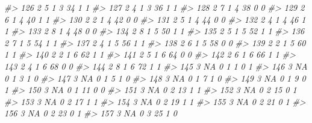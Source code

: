 \documentclass[]{book}
\newenvironment{Shaded}{\begin{snugshade}}{\end{snugshade}}
\newcommand{\CommentTok}[1]{\textcolor[rgb]{0.56,0.35,0.01}{\textit{#1}}}
\begin{document}
\begin{Shaded}
\begin{Highlighting}[]
\CommentTok{#> 126     2         5         1     3    34           1            1}
\CommentTok{#> 127     2         4         1     3    36           1            1}
\CommentTok{#> 128     2         7         1     4    38           0            0}
\CommentTok{#> 129     2         6         1     4    40           1            1}
\CommentTok{#> 130     2         2         1     4    42           0            0}
\CommentTok{#> 131     2         5         1     4    44           0            0}
\CommentTok{#> 132     2         4         1     4    46           1            1}
\CommentTok{#> 133     2         8         1     4    48           0            0}
\CommentTok{#> 134     2         8         1     5    50           1            1}
\CommentTok{#> 135     2         5         1     5    52           1            1}
\CommentTok{#> 136     2         7         1     5    54           1            1}
\CommentTok{#> 137     2         4         1     5    56           1            1}
\CommentTok{#> 138     2         6         1     5    58           0            0}
\CommentTok{#> 139     2         2         1     5    60           1            1}
\CommentTok{#> 140     2         2         1     6    62           1            1}
\CommentTok{#> 141     2         5         1     6    64           0            0}
\CommentTok{#> 142     2         6         1     6    66           1            1}
\CommentTok{#> 143     2         4         1     6    68           0            0}
\CommentTok{#> 144     2         8         1     6    72           1            1}
\CommentTok{#> 145     3        NA         0     1     1           0            1}
\CommentTok{#> 146     3        NA         0     1     3           1            0}
\CommentTok{#> 147     3        NA         0     1     5           1            0}
\CommentTok{#> 148     3        NA         0     1     7           1            0}
\CommentTok{#> 149     3        NA         0     1     9           0            1}
\CommentTok{#> 150     3        NA         0     1    11           0            0}
\CommentTok{#> 151     3        NA         0     2    13           1            1}
\CommentTok{#> 152     3        NA         0     2    15           0            1}
\CommentTok{#> 153     3        NA         0     2    17           1            1}
\CommentTok{#> 154     3        NA         0     2    19           1            1}
\CommentTok{#> 155     3        NA         0     2    21           0            1}
\CommentTok{#> 156     3        NA         0     2    23           0            1}
\CommentTok{#> 157     3        NA         0     3    25           1            0}

\end{Highlighting}
\end{Shaded}
\end{document}
